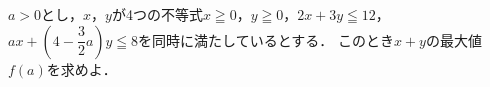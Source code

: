 \documentclass[../../main.tex]{subfiles}
\begin{document}
$a>0$とし，$x$，$y$が4つの不等式$x \geqq 0$，$y \geqq 0$，$2x+3y \leqq 12$，
$\displaystyle ax+ \left( 4-\dfrac{3}{2}a \right) y \leqq 8$を同時に満たしているとする．
このとき$x+y$の最大値$f(a)$を求めよ．
\end{document}
